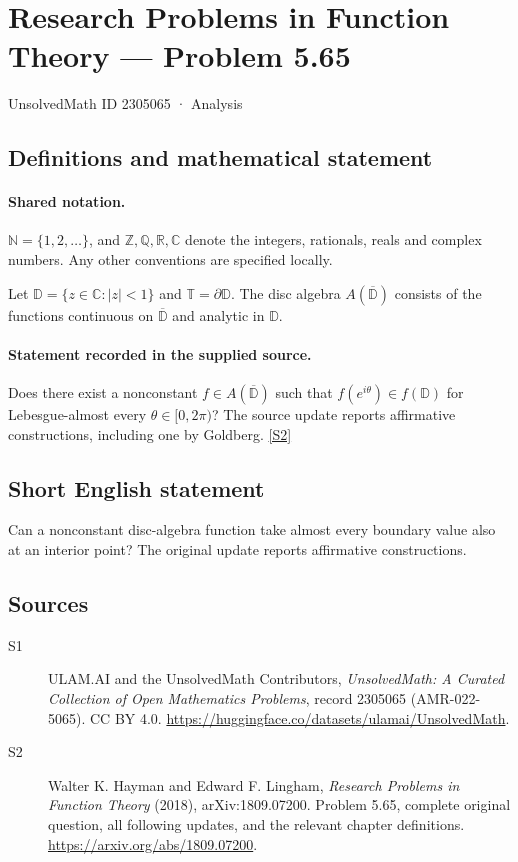 \documentclass[11pt]{book}
\newcommand{\sref}[2]{\hyperlink{source:#1:#2}{[S#2]}}
\begin{document}
\setcounter{section}{2305064}
\section{Research Problems in Function Theory — Problem 5.65}\label{2305065}
{\small\sffamily UnsolvedMath ID 2305065 · Analysis}
\subsection{Definitions and mathematical statement}

\paragraph{Shared notation.}$\mathbb N=\{1,2,\ldots\}$, and $\mathbb Z,\mathbb Q,\mathbb R,\mathbb C$ denote the integers, rationals, reals and complex numbers. Any other conventions are specified locally.


Let $\mathbb D=\{z\in\mathbb C:|z|<1\}$ and $\mathbb T=\partial\mathbb D$. The disc algebra $A(\overline{\mathbb D})$ consists of the functions continuous on $\overline{\mathbb D}$ and analytic in $\mathbb D$.
\paragraph{Statement recorded in the supplied source.}
Does there exist a nonconstant $f\in A(\overline{\mathbb D})$ such that $f(e^{i\theta})\in f(\mathbb D)$ for Lebesgue-almost every $\theta\in[0,2\pi)$? The source update reports affirmative constructions, including one by Gol\textquotesingle dberg. \sref{2305065}{2}
\subsection{Short English statement}
Can a nonconstant disc-algebra function take almost every boundary value also at an interior point? The original update reports affirmative constructions.
\subsection{Sources}
\begin{description}
\item[\hypertarget{source:2305065:1}{S1}] ULAM.AI and the UnsolvedMath Contributors, \emph{UnsolvedMath: A Curated Collection of Open Mathematics Problems}, record 2305065 (AMR-022-5065). CC BY 4.0. \url{https://huggingface.co/datasets/ulamai/UnsolvedMath}.
\item[\hypertarget{source:2305065:2}{S2}] Walter K. Hayman and Edward F. Lingham, \emph{Research Problems in Function Theory} (2018), arXiv:1809.07200. Problem 5.65, complete original question, all following updates, and the relevant chapter definitions. \url{https://arxiv.org/abs/1809.07200}.
\end{description}
\label{end:2305065}
\end{document}
